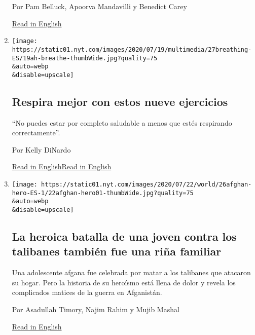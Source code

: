 \begin{enumerate}
  Por Pam Belluck, Apoorva Mandavilli y Benedict Carey

  \href{https://www.nytimes.com/2020/07/11/health/coronavirus-schools-reopen.html}{Read
  in English}
\item
  \href{/es/2020/07/27/espanol/respira-mejor-con-estos-nueve-ejercicios.html}{}

  \texttt{[image: https://static01.nyt.com/images/2020/07/19/multimedia/27breathing-ES/19ah-breathe-thumbWide.jpg?quality=75\\\&auto=webp\\\&disable=upscale]}

  \hypertarget{respira-mejor-con-estos-nueve-ejercicios}{%
  \subsection{Respira mejor con estos nueve
  ejercicios}\label{respira-mejor-con-estos-nueve-ejercicios}}

  ``No puedes estar por completo saludable a menos que estés respirando
  correctamente''.

  Por Kelly DiNardo

  \href{https://www.nytimes.com/2020/07/18/at-home/coronavirus-breathing-exercises.html}{Read
  in
  English}\href{https://www.nytimes.com/2020/07/18/at-home/coronavirus-breathing-exercises.html}{Read
  in English}
\item
  \href{/es/2020/07/26/espanol/mundo/guerra-afganistan-mujeres.html}{}

  \texttt{[image: https://static01.nyt.com/images/2020/07/22/world/26afghan-hero-ES-1/22afghan-hero01-thumbWide.jpg?quality=75\\\&auto=webp\\\&disable=upscale]}

  \hypertarget{la-heroica-batalla-de-una-joven-contra-los-talibanes-tambiuxe9n-fue-una-riuxf1a-familiar}{%
  \subsection{La heroica batalla de una joven contra los talibanes
  también fue una riña
  familiar}\label{la-heroica-batalla-de-una-joven-contra-los-talibanes-tambiuxe9n-fue-una-riuxf1a-familiar}}

  Una adolescente afgana fue celebrada por matar a los talibanes que
  atacaron su hogar. Pero la historia de su heroísmo está llena de dolor
  y revela los complicados matices de la guerra en Afganistán.

  Por Asadullah Timory, Najim Rahim y Mujib Mashal

  \href{https://www.nytimes.com/2020/07/22/world/asia/afghan-hero-woman-taliban.html}{Read
  in English}
\end{enumerate}

